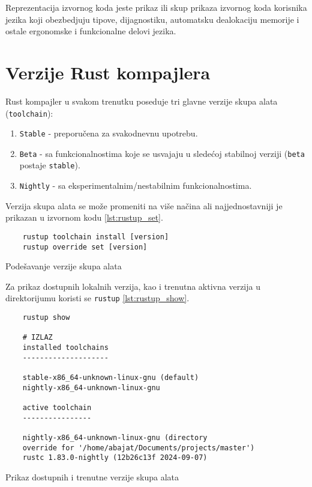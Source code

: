 \documentclass[11pt]{article}
\begin{document}
Reprezentacija izvornog koda jeste prikaz ili skup prikaza izvornog koda korisnika jezika koji obezbedjuju tipove, dijagnostiku,
automatsku dealokaciju memorije i ostale ergonomske i funkcionalne delovi jezika.
\newpage


\section{Verzije Rust kompajlera}

Rust kompajler u svakom trenutku poseduje tri glavne verzije skupa alata (\verb|toolchain|):

\begin{enumerate}
    \item \verb|Stable| - preporučena za svakodnevnu upotrebu. 
    \item \verb|Beta| - sa funkcionalnostima koje se usvajaju u sledećoj stabilnoj verziji (\verb|beta| postaje \verb|stable|).
    \item \verb|Nightly| - sa eksperimentalnim/nestabilnim funkcionalnostima. 
\end{enumerate}

Verzija skupa alata se može promeniti na više načina ali najjednostavniji je prikazan u izvornom kodu \ref{lst:rustup_set}.

\begin{listing}[H]
\begin{verbatim}
    rustup toolchain install [version]
    rustup override set [version]
\end{verbatim}
\caption{Podešavanje verzije skupa alata}
\label{lst:rustup_set}
\end{listing}

Za prikaz dostupnih lokalnih verzija, kao i trenutna aktivna verzija u direktorijumu koristi se \verb|rustup| \ref{lst:rustup_show}.

\begin{listing}[H]
\begin{verbatim}
    rustup show

    # IZLAZ
    installed toolchains
    --------------------
    
    stable-x86_64-unknown-linux-gnu (default)
    nightly-x86_64-unknown-linux-gnu
    
    active toolchain
    ----------------

    nightly-x86_64-unknown-linux-gnu (directory 
    override for '/home/abajat/Documents/projects/master')
    rustc 1.83.0-nightly (12b26c13f 2024-09-07)
\end{verbatim}
\caption{Prikaz dostupnih i trenutne verzije skupa alata}
\label{lst:rustup_show}
\end{listing}
\end{document}
